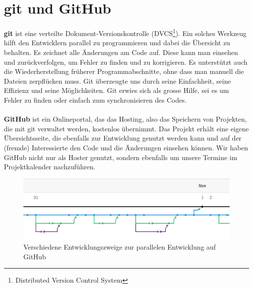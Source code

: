 \documentclass[11pt,a4paper]{scrbook}
\begin{document}
\section{git und GitHub}
\textbf{git} ist eine verteilte Dokument-Versionskontrolle (DVCS\footnote{Distributed Version Control System}). Ein solches Werkzeug hilft
den Entwicklern parallel zu programmieren und dabei die Übersicht zu behalten. Es zeichnet alle Änderungen am Code auf.  Diese kann man einsehen und zurückverfolgen, um Fehler zu finden und zu korrigieren. Es unterstützt auch die Wiederherstellung früherer Programmabschnitte, ohne dass man
manuell die Dateien zerpflücken muss. 
Git überzeugte uns durch seine Einfachheit, seine Effizienz und seine Möglichkeiten.
Git erwies sich als grosse Hilfe, sei es um Fehler zu finden oder einfach zum synchronisieren des Codes.
\\
\\
\textbf{GitHub} ist ein
Onlineportal, das das Hosting, also das Speichern von Projekten, die mit git verwaltet werden, kostenlos übernimmt. Das Projekt erhält eine eigene Übersichtsseite,
die ebenfalls zur Entwicklung genutzt werden kann und auf der (fremde) Interessierte den Code und die Änderungen einsehen können. Wir haben GitHub nicht nur
als Hoster genutzt, sondern ebenfalls um unsere Termine im Projektkalender nachzuführen.
\begin{figure}
\centering
\includegraphics[scale=1]{img/branches.png}
\caption{Verschiedene Entwicklungszweige zur parallelen Entwicklung auf GitHub}
\label{fig:branches}
\end{figure}
\end{document}
